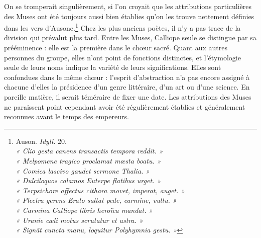 \documentclass[a4paper, 11pt, oneside, polutonikogreek, french]{article}
\begin{document}
On se tromperait singulièrement, si l'on croyait que les attributions particulières des Muses ont été toujours aussi bien établies qu'on les trouve nettement définies dans les vers d'Ausone.\footnote{Auson. \emph{Idyll.} 20.\\\hspace*{5mm}\emph{« Clio gesta canens transactis tempora reddit. »}\\\hspace*{5mm}\emph{« Melpomene tragico proclamat mœsta boatu. »}\\\hspace*{5mm}\emph{« Comica lascivo gaudet sermone Thalia. »}\\\hspace*{5mm}\emph{« Dulciloquos calamos Euterpe flatibus urget. »}\\\hspace*{5mm}\emph{« Terpsichore affectus cithara movet, imperat, auget. »}\\\hspace*{5mm}\emph{« Plectra gerens Erato saltat pede, carmine, vultu. »}\\\hspace*{5mm}\emph{« Carmina Calliope libris heroïca mandat. »}\\\hspace*{5mm}\emph{« Uranie cæli motus scrutatur et astra. »}\\\hspace*{5mm}\emph{« Signât cuncta manu, loquitur Polyhymnia gestu. »}} Chez les plus anciens poètes, il n'y a pas trace de la division qui prévalut plus tard. Entre les Muses, Calliope seule se distingue par sa prééminence : elle est la première dans le chœur sacré. Quant aux autres personnes du groupe, elles n'ont point de fonctions distinctes, et l'étymologie seule de leurs noms indique la variété de leurs significations. Elles sont confondues dans le même chœur : l'esprit d'abstraction n'a pas encore assigné à chacune d'elles la présidence d'un genre littéraire, d'un art ou d'une science. En pareille matière, il serait téméraire de fixer une date. Les attributions des Muses ne paraissent point cependant avoir été régulièrement établies et généralement reconnues avant le temps des empereurs.
\end{document}
